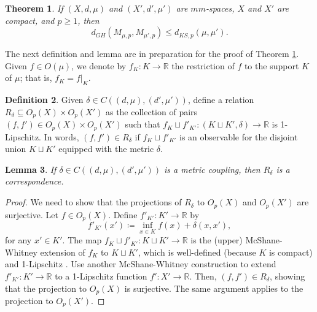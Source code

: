 \documentclass[11pt]{article}
\newtheorem{theorem}{Theorem}[section]
\newtheorem{lemma}[theorem]{Lemma}
\theoremstyle{definition}
\newtheorem{definition}[theorem]{Definition}
\newcommand{\real}{\ensuremath{\mathbb{R}}}
\newcommand{\obs}[1]{\ensuremath{O(#1)}}
\newcommand{\obsp}[1]{\ensuremath{O_p(#1)}}
\newcommand{\meanp}[1]{\ensuremath{M_{#1,p}}}
\newcommand{\dks}{\ensuremath{d_{KS,p}}}
\newcommand{\dgh}{\ensuremath{d_{GH}}}
\begin{document}
\begin{theorem} \label{T:hmean}
If $(X,d,\mu)$ and $(X',d',\mu')$ are $mm$-spaces, $X$ and $X'$ are compact, and $p\geq 1$, then
\[
\dgh(\meanp{\mu}, \meanp{\mu'}) \leq \dks(\mu,\mu').
\]
\end{theorem}

The next definition and lemma are in preparation for the proof of Theorem \ref{T:hmean}. Given $f \in \obs{\mu}$, we denote by $f_K \colon K \to \real$ the restriction of $f$ to the support $K$ of $\mu$; that is, $f_K = f|_K$.

\begin{definition} \label{D:mcoupling}
Given $\delta \in C((d,\mu),(d',\mu'))$, define a relation $R_\delta \subseteq \obsp{X} \times \obsp{X'}$ as the collection of pairs $(f,f') \in \obsp{X} \times \obsp{X'}$ such that $f_K \sqcup f'_{K'} \colon (K \sqcup K', \delta) \to \real$ is 1-Lipschitz. In words, $(f,f') \in R_\delta$ if $f_K \sqcup f'_{K'}$ is an observable for the disjoint union $K \sqcup K'$ equipped with the metric $\delta$.
\end{definition}

\begin{lemma} \label{L:correspondence}
If $\delta \in C((d,\mu),(d',\mu'))$ is a metric coupling, then $R_\delta$ is a correspondence.
\end{lemma}

\begin{proof}
We need to show that the projections of $R_\delta$ to $\obsp{X}$ and $\obsp{X'}$ are surjective. Let $f \in \obsp{X}$. Define $f'_{K'} \colon K' \to \real$ by
\begin{equation}
f'_{K'}(x') \coloneq \inf_{x \in K} f(x) + \delta(x,x'),
\end{equation}
for any $x' \in K'$. The map $f_K \sqcup f'_{K'} \colon K \sqcup K' \to \real$ is the (upper) McShane-Whitney extension of $f_K$ to $K \sqcup K'$, which is well-defined (because $K$ is compact) and 1-Lipschitz \cite{mcshane34,petrakis2018}. Use another McShane-Whitney construction to extend $f'_{K'} \colon K' \to \real$ to a 1-Lipschitz function $f' \colon X' \to \real$. Then, $(f,f') \in R_\delta$, showing that the projection to $\obsp{X}$ is surjective. The same argument applies to the projection to $\obsp{X'}$.
\end{proof}
\end{document}

